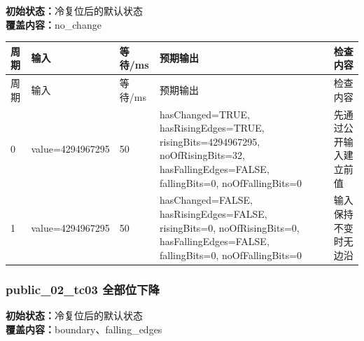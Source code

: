 \noindent\textbf{初始状态：}冷复位后的默认状态\\

\textbf{覆盖内容：}no\_change

\begin{longtable}{L{1.0cm}L{4.7cm}L{1.4cm}L{4.0cm}L{2.1cm}}

\toprule

周期 & 输入 & 等待/ms & 预期输出 & 检查内容\\

\midrule

\endfirsthead

\toprule

周期 & 输入 & 等待/ms & 预期输出 & 检查内容\\

\midrule

\endhead

0 & value=4294967295 & 50 & hasChanged=TRUE, hasRisingEdges=TRUE, risingBits=4294967295, noOfRisingBits=32, hasFallingEdges=FALSE, fallingBits=0, noOfFallingBits=0 & 先通过公开输入建立前值\\

1 & value=4294967295 & 50 & hasChanged=FALSE, hasRisingEdges=FALSE, risingBits=0, noOfRisingBits=0, hasFallingEdges=FALSE, fallingBits=0, noOfFallingBits=0 & 输入保持不变时无边沿\\

\bottomrule

\end{longtable}

\subsubsection{{\ttfamily public\_02\_tc03} 全部位下降}

\noindent\textbf{初始状态：}冷复位后的默认状态\\

\textbf{覆盖内容：}boundary、falling\_edges

